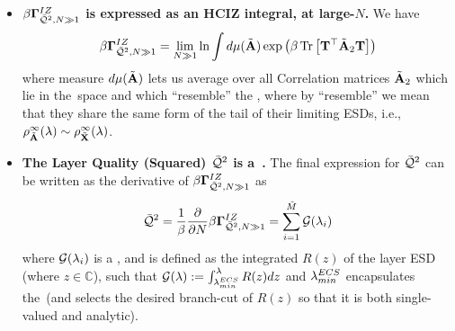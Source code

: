 \begin{itemize}
  \item
  \textbf{$\beta\mathbf{\Gamma}^{IZ}_{\bar{\mathcal{Q}}^{2},N\gg 1}$ is expressed as an HCIZ integral, at large-$N$.}
  We have
  \begin{align}
  \label{eqn:IZGINF_HCIZ}
  \IZGINF = \lim_{N\gg 1}\ln\int d\mu(\AECS)\exp\left(\beta\Trace{\mathbf{T}^{\TR}\AECS_2\mathbf{T}}\right) %
  \end{align}
  where  measure $d\mu(\tilde{\mathbf{A}})$ lets us average over all \Student Correlation matrices $\tilde{\mathbf{A}}_{2}$ which
  lie in the~\ECS space and which ``resemble'' the \Teacher, 
  where by ``resemble'' we mean that they share the same form of the tail of
  their limiting ESDs,
  i.e., $\rho^{\infty}_{\tilde{\mathbf{A}}}(\lambda)\sim\rho^{\infty}_{\tilde{\mathbf{X}}}(\lambda)$.
  \item
  \textbf{The Layer Quality (Squared) $\bar{\mathcal{Q}}^{2}$ is a~\GEN.}
  The final expression for $\bar{\mathcal{Q}}^{2}$ can be written as the derivative of $\beta\mathbf{\Gamma}^{IZ}_{\bar{\mathcal{Q}}^{2},N\gg 1}$  as
  \begin{align}
    \label{eqn:QT_result}
    \bar{\mathcal{Q}}^{2} = \dfrac{1}{\beta}\dfrac{\partial}{\partial N}\beta\mathbf{\Gamma}^{IZ}_{\bar{\mathcal{Q}}^{2},N\gg 1} = \sum_{i=1}^{\tilde{M}}\mathcal{G}(\lambda_{i})
  \end{align}
  where $\mathcal{G}(\lambda_{i})$ is a \emph{\GEN}, and is  defined as the integrated \emph{\RTransform} $R(z)$ of the \Teacher
  layer ESD (where $z\in\mathbb{C}$), such that $\mathcal{G(\lambda)}:= \int_{\lambda^{ECS}_{min}}^{\lambda}R(z)dz$
  and $\lambda^{ECS}_{min}$  encapsulates  the~\ECS (and selects the desired branch-cut of $R(z)$
  so that it is both single-valued and analytic).
\end{itemize}



